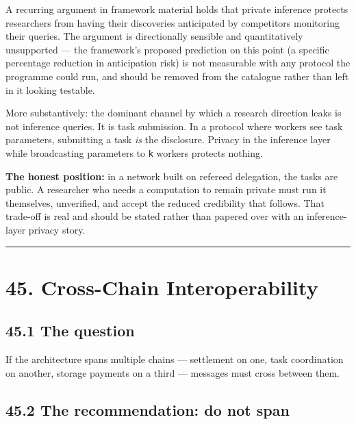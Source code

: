 \documentclass[
  11pt]{report}
\begin{document}
A recurring argument in framework material holds that private inference
protects researchers from having their discoveries anticipated by
competitors monitoring their queries. The argument is directionally
sensible and quantitatively unsupported --- the framework's proposed
prediction on this point (a specific percentage reduction in
anticipation risk) is not measurable with any protocol the programme
could run, and should be removed from the catalogue rather than left in
it looking testable.

More substantively: the dominant channel by which a research direction
leaks is not inference queries. It is task submission. In a protocol
where workers see task parameters, submitting a task \emph{is} the
disclosure. Privacy in the inference layer while broadcasting parameters
to \texttt{k} workers protects nothing.

\textbf{The honest position:} in a network built on refereed delegation,
the tasks are public. A researcher who needs a computation to remain
private must run it themselves, unverified, and accept the reduced
credibility that follows. That trade-off is real and should be stated
rather than papered over with an inference-layer privacy story.

\begin{center}\rule{0.5\linewidth}{0.5pt}\end{center}

\hypertarget{cross-chain-interoperability}{%
\chapter{45. Cross-Chain
Interoperability}\label{cross-chain-interoperability}}

\hypertarget{the-question-1}{%
\section{45.1 The question}\label{the-question-1}}

If the architecture spans multiple chains --- settlement on one, task
coordination on another, storage payments on a third --- messages must
cross between them.

\hypertarget{the-recommendation-do-not-span}{%
\section{45.2 The recommendation: do not
span}\label{the-recommendation-do-not-span}}
\end{document}
